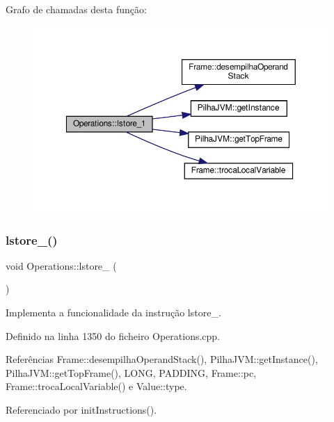 Grafo de chamadas desta função\+:
\nopagebreak
\begin{figure}[H]
\begin{center}
\leavevmode
\includegraphics[width=350pt]{classOperations_aa162cef00367e3d5fb5dca12494a5793_cgraph}
\end{center}
\end{figure}
\mbox{\label{classOperations_a178660c2b3ca2625c140daf867531386}} 
\subsubsection{\texorpdfstring{lstore\+\_()}{lstore\_2()}}
{\footnotesize\ttfamily void Operations\+::lstore\+\_ (\begin{DoxyParamCaption}{ }\end{DoxyParamCaption})\hspace{0.3cm}{\ttfamily [private]}}



Implementa a funcionalidade da instrução lstore\+\_. 



Definido na linha 1350 do ficheiro Operations.\+cpp.



Referências Frame\+::desempilha\+Operand\+Stack(), Pilha\+J\+V\+M\+::get\+Instance(), Pilha\+J\+V\+M\+::get\+Top\+Frame(), L\+O\+NG, P\+A\+D\+D\+I\+NG, Frame\+::pc, Frame\+::troca\+Local\+Variable() e Value\+::type.



Referenciado por init\+Instructions().

